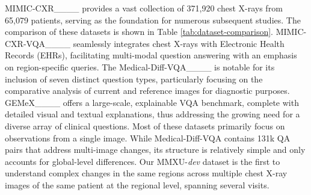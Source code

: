 MIMIC-CXR____ provides a vast collection of 371,920 chest X-rays from 65,079 patients, serving as the foundation for numerous subsequent studies. The comparison of these datasets is shown in Table \ref{tab:dataset-comparison}.  MIMIC-CXR-VQA____ seamlessly integrates chest X-rays with Electronic Health Records (EHRs), facilitating multi-modal question answering with an emphasis on region-specific queries. The Medical-Diff-VQA____ is notable for its inclusion of seven distinct question types, particularly focusing on the comparative analysis of current and reference images for diagnostic purposes. GEMeX____ offers a large-scale, explainable VQA benchmark, complete with detailed visual and textual explanations, thus addressing the growing need for a diverse array of clinical questions. Most of these datasets primarily focus on observations from a single image. While Medical-Diff-VQA contains 131k QA pairs that address multi-image changes, its structure is relatively simple and only accounts for global-level differences. Our MMXU-\textit{dev} dataset is the first to understand complex changes in the same regions across multiple chest X-ray images of the same patient at the regional level, spanning several visits.